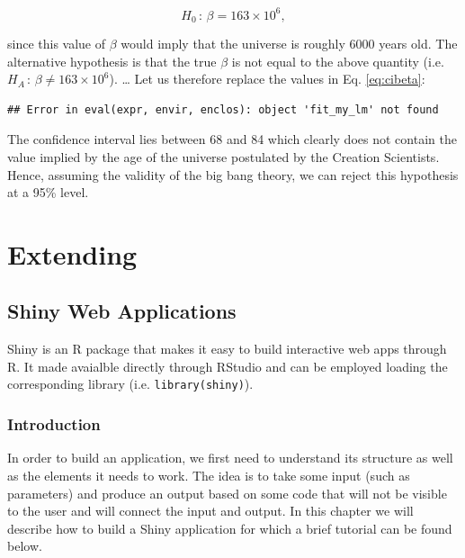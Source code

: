 \documentclass[12pt,]{krantz}
\newenvironment{Shaded}{\begin{snugshade}}{\end{snugshade}}
\newcommand{\CommentTok}[1]{\textcolor[rgb]{0.37,0.37,0.37}{\textit{#1}}}
\newcommand{\OperatorTok}[1]{\textcolor[rgb]{0.43,0.43,0.43}{\textbf{#1}}}
\newcommand{\NormalTok}[1]{#1}
\begin{document}
\begin{equation*}
  H_0 \, : \, \beta = 163 \times 10^6 ,
\end{equation*}

since this value of \(\beta\) would imply that the universe is roughly
6000 years old. The alternative hypothesis is that the true \(\beta\) is
not equal to the above quantity (i.e.
\(H_A \, : \, \beta \neq 163 \times 10^6\)). \ldots{} Let us therefore
replace the values in Eq. \eqref{eq:cibeta}:

\begin{Shaded}
\end{Shaded}

\begin{verbatim}
## Error in eval(expr, envir, enclos): object 'fit_my_lm' not found
\end{verbatim}

The confidence interval lies between 68 and 84 which clearly does not
contain the value implied by the age of the universe postulated by the
Creation Scientists. Hence, assuming the validity of the big bang
theory, we can reject this hypothesis at a 95\% level.

\part{Extending}\label{part-extending}

\chapter{Shiny Web Applications}\label{shiny-web-applications}

Shiny is an R package that makes it easy to build interactive web apps
through R. It made avaialble directly through RStudio and can be
employed loading the corresponding library (i.e.
\texttt{library(shiny)}).

\section{Introduction}\label{introduction-3}

In order to build an application, we first need to understand its
structure as well as the elements it needs to work. The idea is to take
some input (such as parameters) and produce an output based on some code
that will not be visible to the user and will connect the input and
output. In this chapter we will describe how to build a Shiny
application for which a brief tutorial can be found below.
\end{document}
